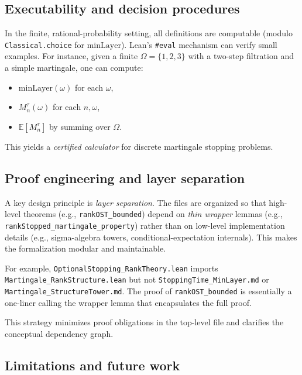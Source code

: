 \documentclass[11pt]{article}
\theoremstyle{definition}
\theoremstyle{remark}
\newcommand{\minLayer}{\mathrm{minLayer}}
\newcommand{\EE}{\mathbb{E}}
\begin{document}
\subsection{Executability and decision procedures}

In the finite, rational-probability setting, all definitions are computable (modulo \texttt{Classical.choice} for $\minLayer$).
Lean's \texttt{\#eval} mechanism can verify small examples.
For instance, given a finite $\Omega = \{1,2,3\}$ with a two-step filtration and a simple martingale, one can compute:
\begin{itemize}
\item $\minLayer(\omega)$ for each $\omega$,
\item $M^\tau_n(\omega)$ for each $n, \omega$,
\item $\EE[M^\tau_n]$ by summing over $\Omega$.
\end{itemize}

This yields a \emph{certified calculator} for discrete martingale stopping problems.

\subsection{Proof engineering and layer separation}

A key design principle is \emph{layer separation}.
The files are organized so that high-level theorems (e.g., \texttt{rankOST\_bounded}) depend on \emph{thin wrapper} lemmas (e.g., \texttt{rankStopped\_martingale\_property}) rather than on low-level implementation details (e.g., sigma-algebra towers, conditional-expectation internals).
This makes the formalization modular and maintainable.

For example, \texttt{OptionalStopping\_RankTheory.lean} imports \texttt{Martingale\_RankStructure.lean} but not \texttt{StoppingTime\_MinLayer.md} or \texttt{Martingale\_StructureTower.md}.
The proof of \texttt{rankOST\_bounded} is essentially a one-liner calling the wrapper lemma that encapsulates the full proof.

This strategy minimizes proof obligations in the top-level file and clarifies the conceptual dependency graph.

\subsection{Limitations and future work}
\end{document}
